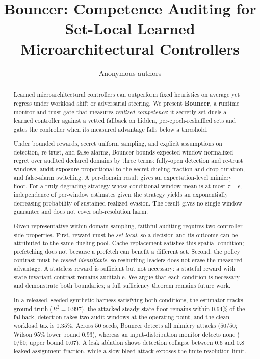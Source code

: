 \documentclass{article}
\begin{document}
\title{Bouncer: Competence Auditing for\\ Set-Local Learned Microarchitectural Controllers}

\author{Anonymous authors}

\maketitle

\begin{abstract}
Learned microarchitectural controllers can outperform fixed heuristics on average
yet regress under workload shift or adversarial steering. We present
\textbf{Bouncer}, a runtime monitor and trust gate that measures \emph{realized
competence}: it secretly set-duels a learned controller against a vetted fallback
on hidden, per-epoch-reshuffled sets and gates the controller when its measured
advantage falls below a threshold.

Under bounded rewards, secret uniform sampling, and explicit assumptions on
detection, re-trust, and false alarms, Bouncer bounds expected window-normalized
regret over audited declared domains by three terms: fully-open detection and
re-trust windows, audit exposure proportional to the secret dueling fraction and
drop duration, and false-alarm switching. A per-domain result gives an
expectation-level mimicry floor. For a truly degrading strategy whose conditional
window mean is at most $\tau-\epsilon$, independence of per-window estimates given
the strategy yields an exponentially decreasing probability of sustained realized
evasion. The result gives no single-window guarantee and does not cover
sub-resolution harm.

Given representative within-domain sampling, faithful auditing requires two
controller-side properties. First, reward must be \emph{set-local},
so a decision and its outcome can be attributed to the same dueling pool. Cache
replacement satisfies this spatial condition; prefetching does not because a
prefetch can benefit a different set. Second, the policy contrast must be
\emph{reseed-identifiable}, so reshuffling leaders does not erase the measured
advantage. A stateless reward is sufficient but not necessary: a stateful reward
with state-invariant contrast remains auditable. We argue that each condition is
necessary and demonstrate both boundaries; a full sufficiency theorem remains
future work.

In a released, seeded synthetic harness satisfying both conditions, the estimator
tracks ground truth ($R^2{=}0.997$), the attacked steady-state floor remains within
$0.64\%$ of the fallback, detection takes two audit windows at the operating point,
and the clean-workload tax is $0.35\%$. Across $50$ seeds, Bouncer detects all
mimicry attacks ($50/50$; Wilson $95\%$ lower bound $0.93$), whereas an
input-distribution monitor detects none ($0/50$; upper bound $0.07$). A leak
ablation shows detection collapse between $0.6$ and $0.8$ leaked assignment
fraction, while a slow-bleed attack exposes the finite-resolution limit.


\end{abstract}
\end{document}
